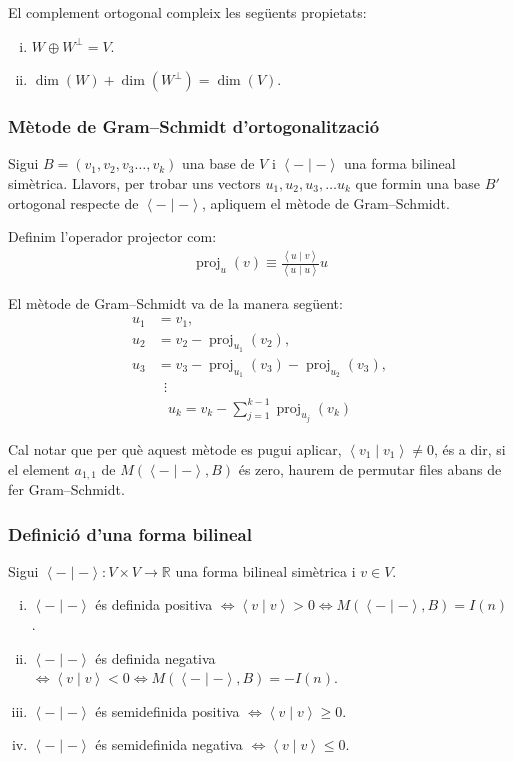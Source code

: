 El complement ortogonal compleix les següents propietats:
\begin{enumerate}[i)]
    \item $W \oplus W^{\perp} = V$.
    \item $\dim (W) + \dim (W^{\perp}) = \dim (V)$.
\end{enumerate}

\subsubsection*{Mètode de Gram--Schmidt d'ortogonalització}
Sigui $B = (v_{1}, v_{2}, v_{3} \dots , v_{k})$ una base de $V$ i $\left< - \mid - \right>$ una forma bilineal simètrica. Llavors, per trobar uns vectors $u_{1}, u_{2}, u_{3}, \dots u_{k}$ que formin una base $B'$ ortogonal respecte de $\left< - \mid - \right>$, apliquem el mètode de Gram--Schmidt.

Definim l'operador projector com:
\begin{align}
    \operatorname{proj}_{u} (v) \equiv \frac{\left< u \mid v \right>}{\left< u \mid u \right>} u
\end{align}

El mètode de Gram--Schmidt va de la manera següent:
\begin{align*}
    u_{1} & = v_{1}, \\
    u_{2} & = v_{2} - \operatorname{proj}_{u_{1}} (v_{2}), \\
    u_{3} & = v_{3} - \operatorname{proj}_{u_{1}} (v_{3}) - \operatorname{proj}_{u_{2}} (v_{3}), \\
    & \, \, \, \vdots
\end{align*}
\begin{align}
    u_{k} = v_{k} - \sum\limits_{j=1}^{k-1} \operatorname{proj}_{u_{j}} (v_{k})
\end{align}

Cal notar que per què aquest mètode es pugui aplicar, $\left< v_{1} \mid v_{1} \right> \neq 0$, és a dir, si el element $a_{1,1}$ de $M(\left< - \mid - \right>, B)$ és zero, haurem de permutar files abans de fer Gram--Schmidt.

\subsubsection*{Definició d'una forma bilineal}
Sigui $\left< - \mid - \right>: V \times V \to \mathbb{R}$ una forma bilineal simètrica i $v \in V$.
\begin{enumerate}[i)]
    \item $\left< - \mid - \right>$ és definida positiva $\Leftrightarrow \left< v \mid v \right> > 0  \Leftrightarrow M( \left< - \mid - \right> , B ) = I(n)$.
    \item $\left< - \mid - \right>$ és definida negativa $\Leftrightarrow \left< v \mid v \right> < 0 \Leftrightarrow M( \left< - \mid - \right> , B ) = -I(n)$.
    \item $\left< - \mid - \right>$ és semidefinida positiva $\Leftrightarrow \left< v \mid v \right> \geq 0$.
    \item $\left< - \mid - \right>$ és semidefinida negativa $\Leftrightarrow \left< v \mid v \right> \leq 0$.
\end{enumerate}

